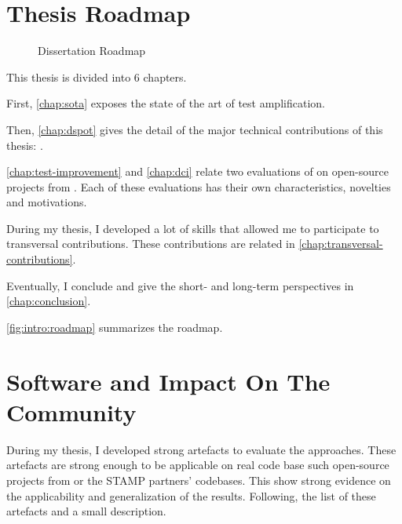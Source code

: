 \section{Thesis Roadmap}
\label{sec:intro:roadmap}

\begin{figure}[h]
	\centering
	\caption{Dissertation Roadmap}
	\label{fig:intro:roadmap}
\end{figure}

This thesis is divided into 6 chapters.

First, \autoref{chap:sota} exposes the state of the art of test amplification.

Then, \autoref{chap:dspot} gives the detail of the major technical contributions of this thesis: \dspot.

\autoref{chap:test-improvement} and \autoref{chap:dci} relate two evaluations of \dspot on open-source projects from \gh.
Each of these evaluations has their own characteristics, novelties and motivations.

During my thesis, I developed a lot of skills that allowed me to participate to transversal contributions. 
These contributions are related in \autoref{chap:transversal-contributions}.

Eventually, I conclude and give the short- and long-term perspectives in \autoref{chap:conclusion}.

\autoref{fig:intro:roadmap} summarizes the roadmap.

\section{Software and Impact On The Community}
\label{sec:intro:software}

During my thesis, I developed strong artefacts to evaluate the approaches.
These artefacts are strong enough to be applicable on real code base such open-source projects from \gh or the STAMP partners' codebases.
This show strong evidence on the applicability and generalization of the results.
Following, the list of these artefacts and a small description.

